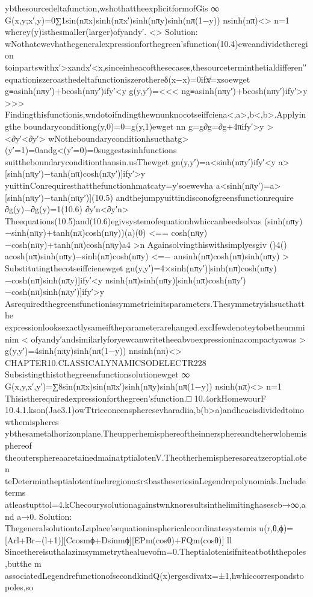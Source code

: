 {{{{{{{{{{{{ybthesourcedeltafunction,wshothattheexplicitformofGis
∞
G(x,y;x′,y)=0∑1sin(nπx)sinh(nπx′)sinh(nπy)sinh(nπ(1−y))
nsinh(nπ)<>
n=1
wherey(y)isthesmaller(larger)ofyandy′.
<>
Solution:
wNothatewevhathegeneralexpressionforthegreen’sfunction(10.4)ewcandividetheregion
toinpartswithx′>xandx′<x,sinceinheacofthesecases,thesourceterminthetialdifferen′′
equationiszeroasthedeltafunctioniszerothere{δ(x−x)=0ifx̸=xsoewget
g≡asinh(nπy′)+bcosh(nπy′)ify′<y
g(y,y′)=<<<
ng≡asinh(nπy′)+bcosh(nπy′)ify′>y
>>>
Findingthisfunctionis,wndotoifndingthewnunknocotseiffciena<,a>,b<,b>.Applyingthe
boundaryconditiong(y,0)=0=g(y,1)ewget
nn
g=g∂g=∂g+4πify′>y
><∂y′<∂y′>
wNotheboundaryconditionhsucthatg>(y′=1)=0andg<(y′=0)=0suggestssinhfunctions
suittheboundaryconditionthansin.usThewget
{
gn(y,y′)=a<sinh(nπy′)ify′<y
a>[sinh(nπy′)−tanh(nπ)cosh(nπy′)]ify′>y
yuittinConrequiresthatthefunctionhmatcaty=y′soewevha
a<sinh(nπy′)=a>[sinh(nπy′)−tanh(nπy′)](10.5)
andthejumpyuittindisconofgreensfunctionrequire
∂g(y)−∂g(y)=1(10.6)
∂y′n<∂y′n>
Theequations(10.5)and(10.6)egivsystemofequationhwhiccanbeedsolvas
(sinh(nπy)−sinh(nπy)+tanh(nπ)cosh(nπy))(a)(0)
<==
cosh(nπy)−cosh(nπy)+tanh(nπ)cosh(nπy)a4
>n
Againsolvingthiswithsimplyesgiv
()4()
acosh(nπ)sinh(nπy)−sinh(nπ)cosh(nπy)
<=−
ansinh(nπ)cosh(nπ)sinh(nπy)
>
Substitutingthecotseiffcienewget
{
gn(y,y′)=4×sinh(nπy′)[sinh(nπ)cosh(nπy)−cosh(nπ)sinh(nπy)]ify′<y
nsinh(nπ)sinh(nπy)[sinh(nπ)cosh(nπy′)−cosh(nπ)sinh(nπy′)]ify′>y
Asrequiredthegreensfunctionissymmetricinitsparameters.Thesymmetryishsucthatthe
expressionlooksexactlysameiftheparameterarehanged.excIfewdenoteytobetheumminim
<
ofyandy′andsimilarlyforyewcanwritetheeabvoexpressioninacompactyawas
>
g(y,y′)=4sinh(nπy)sinh(nπ(1−y))
nnsinh(nπ)<>
CHAPTER10.CLASSICALYNAMICSODELECTR228
Subsistingthistothegreensfunctionsolutionewget
∞
G(x,y,x′,y′)=∑8sin(nπx)sin(nπx′)sinh(nπy)sinh(nπ(1−y))
nsinh(nπ)<>
n=1
Thisistherequiredexpressionforthegreen’sfunction.□
10.4orkHomewourF
10.4.1.kson(Jac3.1)owTtricconcenspheresevharadiia,b(b>a)andheacisdividedtoinowthemispheres
ybthesametalhorizonplane.Theupperhemisphereoftheinnersphereandteherwlohemisphereof
theoutersphereaaretainedmainatptialotenV.Theotherhemispheresareatzeroptial.oten
teDetermintheptialotentinehregiona≤r≤bastheseriesinLegendrepolynomials.Includeterms
atleastupttol=4.kChecourysolutionagainstwnknoresultsinthelimitinghasescb→∞,and
a→0.
Solution:
ThegeneralsolutiontoLaplace’sequationinsphericalcoordinatesystemis
u(r,θ,ϕ)=[Arl+Br−(l+1)][Ccosmϕ+Dsinmϕ][EPm(cosθ)+FQm(cosθ)]
ll
Sincethereisuthalazimsymmetrythealuevofm=0.Theptialotenisifniteatboththepoles,butthe
m
associatedLegendrefunctionofsecondkindQ(x)ergesdivatx=±1,hwhiccorrespondstopoles,so
}}}}}}}}}}}}}}}
